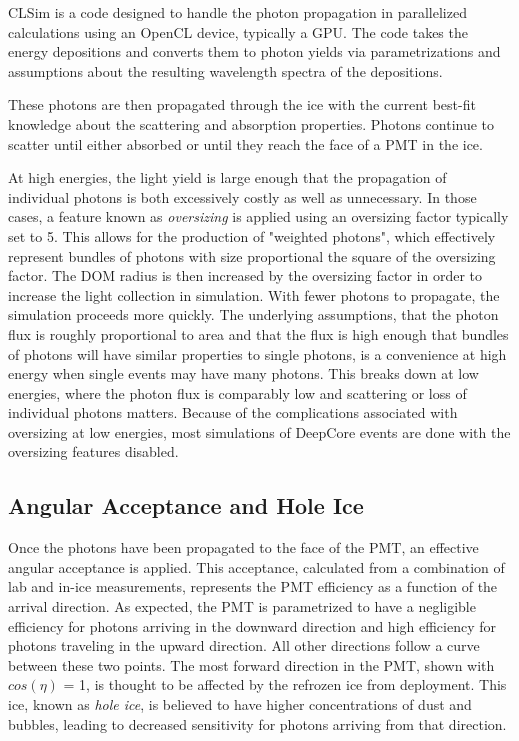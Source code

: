 CLSim is a code designed to handle the photon propagation in parallelized calculations using an OpenCL device, typically a GPU.
The code takes the energy depositions and converts them to photon yields via parametrizations and assumptions about the resulting wavelength spectra of the depositions.

These photons are then propagated through the ice with the current best-fit knowledge about the scattering and absorption properties. 
Photons continue to scatter until either absorbed or until they reach the face of a PMT in the ice.

At high energies, the light yield is large enough that the propagation of individual photons is both excessively costly as well as unnecessary.
In those cases, a feature known as \emph{oversizing} is applied using an oversizing factor typically set to 5.
This allows for the production of "weighted photons", which effectively represent bundles of photons with size proportional the square of the oversizing factor.
The DOM radius is then increased by the oversizing factor in order to increase the light collection in simulation.
With fewer photons to propagate, the simulation proceeds more quickly. 
The underlying assumptions, that the photon flux is roughly proportional to area and that the flux is high enough that bundles of photons will have similar properties to single photons, is a convenience at high energy when single events may have many photons.
This breaks down at low energies, where the photon flux is comparably low and scattering or loss of individual photons matters.
Because of the complications associated with oversizing at low energies, most simulations of DeepCore events are done with the oversizing features disabled.

\subsection{Angular Acceptance and Hole Ice}
\label{subsec:holeice_sim}
Once the photons have been propagated to the face of the PMT, an effective angular acceptance is applied.
This acceptance, calculated from a combination of lab and in-ice measurements, represents the PMT efficiency as a function of the arrival direction.
As expected, the PMT is parametrized to have a negligible efficiency for photons arriving in the downward direction and high efficiency for photons traveling in the upward direction.
All other directions follow a curve between these two points.
The most forward direction in the PMT, shown with $cos(\eta)$ = 1, is thought to be affected by the refrozen ice from deployment. 
This ice, known as \emph{hole ice}, is believed to have higher concentrations of dust and bubbles, leading to decreased sensitivity for photons arriving from that direction.

